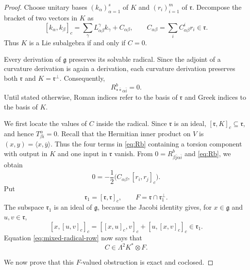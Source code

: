 \documentclass{amsart}
\begin{document}
\begin{proof}
Choose unitary bases $(k_\alpha)_{\alpha=1}^s$ of $K$ and
$(r_i)_{i=1}^m$ of $\mathfrak r$.  Decompose the bracket of two
vectors in $K$ as
\begin{equation}\label{eq:full-bracket-KK}
 [k_\alpha,k_\beta]_c
 =\sum_\gamma L^\gamma_{\alpha\beta}k_\gamma
  +C_{\alpha\beta},
 \qquad
 C_{\alpha\beta}=\sum_iC^i_{\alpha\beta}r_i\in\mathfrak r .
\end{equation}
Thus $K$ is a Lie subalgebra if and only if $C=0$.

Every derivation of $\mathfrak g$ preserves its solvable radical.
Since the adjoint of a curvature derivation is again a derivation,
each curvature derivation preserves both $\mathfrak r$ and
$K=\mathfrak r^\perp$.  Consequently,
\[
 R^b_{\ast\bar\ast\alpha\bar i}=0.
\]
Until stated otherwise, Roman indices refer to the basis of $\mathfrak r$
and Greek indices to the basis of $K$.

We first locate the values of $C$ inside the radical.  Since
$\mathfrak r$ is an ideal, $[\mathfrak r,K]_c\subseteq\mathfrak r$, and hence
$T^\alpha_{\beta i}=0$.
Recall that the Hermitian inner product on $V$ is
$(x,y)=\langle x,\overline y\rangle$. Thus the four terms in
\eqref{eq:Rb} containing a torsion component with output in $K$ and one
input in $\mathfrak r$ vanish. From
$0=R^b_{\beta\bar j\alpha\bar i}$ and \eqref{eq:Rb}, we obtain
\begin{equation}\label{eq:mixed-radical-row}
 0=-\frac{1}{2}\big(C_{\alpha\beta},[r_i,r_j]_c\big).
\end{equation}
Put
\[
 \mathfrak r_1=[\mathfrak r,\mathfrak r]_c,
 \qquad F=\mathfrak r\cap\mathfrak r_1^{\perp}.
\]
The subspace $\mathfrak r_1$ is an ideal of $\mathfrak g$, because
the Jacobi identity gives, for $x\in\mathfrak g$ and $u,v\in\mathfrak r$,
\[
 [x,[u,v]_c]_c=[[x,u]_c,v]_c+[u,[x,v]_c]_c\in\mathfrak r_1.
\]
Equation \eqref{eq:mixed-radical-row} now says that
\begin{equation}\label{eq:C-first-layer}
 C\in\Lambda^2K^*\otimes F.
\end{equation}

We now prove that this $F$-valued obstruction is exact and coclosed.


\end{proof}
\end{document}
